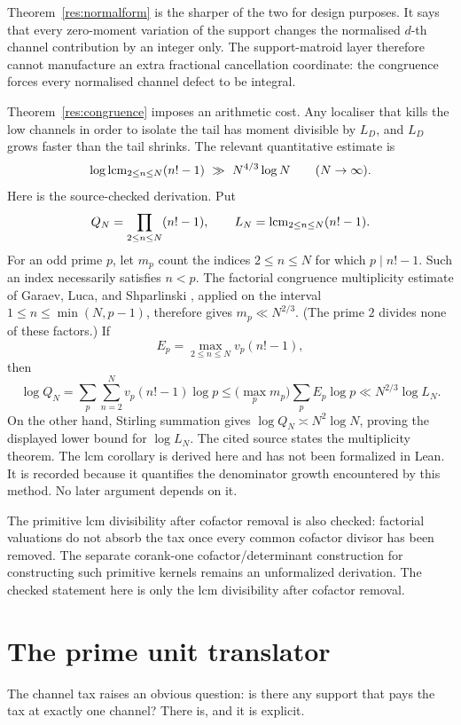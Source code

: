 \documentclass[11pt]{article}
\newcommand{\Lc}{L}
\begin{document}
\noindent Theorem~\ref{res:normalform} is the sharper of the two for design
purposes.  It says that every zero-moment variation of the support changes the
normalised $d$-th channel contribution by an integer only.  The support-matroid
layer therefore cannot manufacture an extra fractional cancellation coordinate:
the congruence forces every normalised channel defect to be integral.

Theorem~\ref{res:congruence} imposes an arithmetic cost.  Any localiser that
kills the low channels in order to isolate the tail has moment divisible by
$\Lc_D$, and $\Lc_D$ grows faster than the tail shrinks.  The relevant
quantitative estimate is
\[
  \log \lcm_{2\le n\le N}(n!-1)\ \gg\ N^{4/3}\log N
  \qquad(N\to\infty).
\]
Here is the source-checked derivation.  Put
\[
  Q_N=\prod_{2\le n\le N}(n!-1),
  \qquad
  L_N=\operatorname{lcm}_{2\le n\le N}(n!-1).
\]
For an odd prime $p$, let $m_p$ count the indices $2\le n\le N$ for which
$p\mid n!-1$.  Such an index necessarily satisfies $n<p$.  The factorial
congruence multiplicity estimate of Garaev, Luca, and Shparlinski
\cite[arXiv v1, Thm.~12, p.~16]{garaev-luca-shparlinski}, applied on the
interval $1\le n\le\min(N,p-1)$, therefore gives
$m_p\ll N^{2/3}$.  (The prime $2$ divides none of these factors.)  If
\[
  E_p=\max_{2\le n\le N}v_p(n!-1),
\]
then
\[
  \log Q_N
  =\sum_p\sum_{n=2}^{N}v_p(n!-1)\log p
  \le \bigl(\max_p m_p\bigr)\sum_p E_p\log p
  \ll N^{2/3}\log L_N .
\]
On the other hand, Stirling summation gives
$\log Q_N\asymp N^2\log N$, proving the displayed lower bound for
$\log L_N$.  The cited source states the multiplicity theorem.  The lcm
corollary is derived here and has not been formalized in Lean.  It is recorded
because it quantifies the denominator growth encountered by this method.  No
later argument depends on it.

The primitive lcm divisibility after cofactor removal is also checked:
factorial valuations do not absorb the tax once every common cofactor divisor
has been removed.  The separate corank-one cofactor/determinant construction
for constructing such primitive kernels remains an unformalized derivation.
The checked statement here is only the lcm divisibility after cofactor removal.

\section{The prime unit translator}\label{sec:translator}

The channel tax raises an obvious question: is there any support that pays the
tax at exactly one channel?  There is, and it is explicit.
\end{document}
